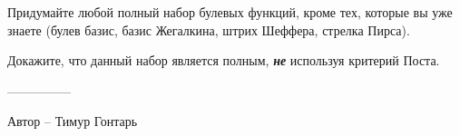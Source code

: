 \question
Придумайте любой полный набор булевых функций, кроме тех, которые вы уже знаете (булев базис, базис Жегалкина, штрих Шеффера, стрелка Пирса).

Докажите, что данный набор является полным, \textbf{\textit{не}} используя критерий Поста.

---------------

Автор -- Тимур Гонтарь